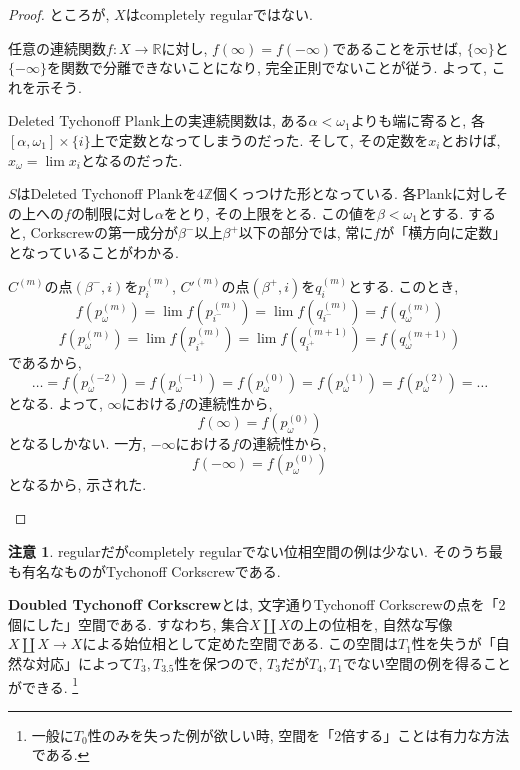 \documentclass[a4paper, twoside]{bxjsarticle}
\newcommand{\zah}{\mathbb{Z}}
\newcommand{\rea}{\mathbb{R}}
\theoremstyle{definition}
\newtheorem{rem}[thm]{注意}
\begin{document}
\begin{proof}
            ところが, $X$はcompletely regularではない.
            \begin{framed}
                任意の連続関数$f\colon X\to \rea$に対し, $f(\infty)=f(-\infty)$であることを示せば, $\{\infty\}$と$\{-\infty\}$を関数で分離できないことになり,  完全正則でないことが従う. よって, これを示そう.
                
                Deleted Tychonoff Plank上の実連続関数は,  ある$\alpha<\omega_1$よりも端に寄ると, 各$[\alpha, \omega_1]\times\{i\}$上で定数となってしまうのだった. そして, その定数を$x_i$とおけば, $x_\omega = \lim x_i$となるのだった.
                
                $S$はDeleted Tychonoff Plankを$4 \zah$個くっつけた形となっている. 各Plankに対しその上への$f$の制限に対し$\alpha$をとり, その上限をとる. この値を$\beta<\omega_1$とする. すると, Corkscrewの第一成分が$\beta^-$以上$\beta^+$以下の部分では, 常に$f$が「横方向に定数」となっていることがわかる.
                
                $C^{(m)}$の点$(\beta^-, i)$を$p^{(m)}_i$, $C'^{(m)}$の点$(\beta^+, i)$を$q^{(m)}_i$とする. このとき, \[f(p^{(m)}_\omega)=\lim f(p^{(m)}_{i^-})=\lim f(q^{(m)}_{i^-})=f(q^{(m)}_\omega)\]
                \[f(p^{(m)}_\omega)=\lim f(p^{(m)}_{i^+})=\lim f(q^{(m+1)}_{i^+})=f(q^{(m+1)}_\omega)\]
                であるから, 
                \[\dots=f(p^{(-2)}_\omega)=f(p^{(-1)}_\omega)=f(p^{(0)}_\omega)=f(p^{(1)}_\omega)=f(p^{(2)}_\omega)=\dots\]
                となる. よって, $\infty$における$f$の連続性から, \[f(\infty)=f(p^{(0)}_\omega)\]
                となるしかない. 一方, $-\infty$における$f$の連続性から, \[f(-\infty)=f(p^{(0)}_\omega)\]となるから, 示された.
            \end{framed}
        \end{proof}
        \begin{rem}
            regularだがcompletely regularでない位相空間の例は少ない. そのうち最も有名なものがTychonoff Corkscrewである.
            
            \textbf{Doubled Tychonoff Corkscrew}とは, 文字通りTychonoff Corkscrewの点を「2個にした」空間である. すなわち, 集合$X\coprod X$の上の位相を, 自然な写像$X\coprod X\to X$による始位相として定めた空間である. この空間は$T_1$性を失うが「自然な対応」によって$T_3, T_{3.5}$性を保つので, $T_3$だが$T_4, T_1$でない空間の例を得ることができる. \footnote{一般に$T_0$性のみを失った例が欲しい時, 空間を「2倍する」ことは有力な方法である.}
        \end{rem}
\end{document}
